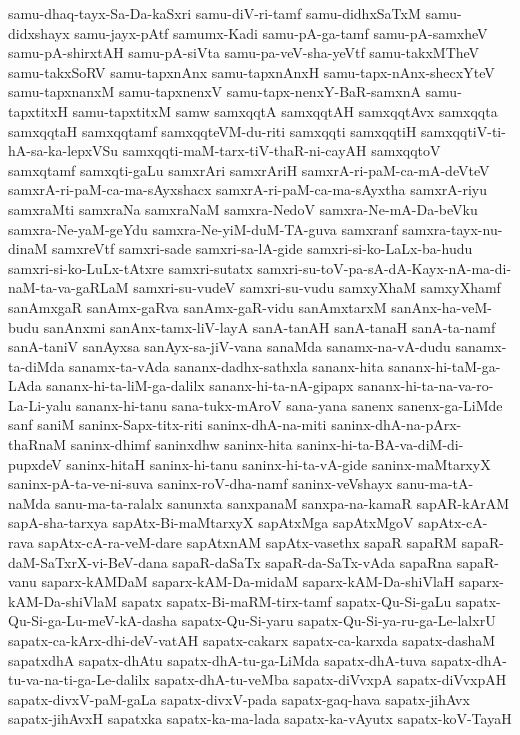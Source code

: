 {samu-dhaq-tayx-Sa-Da-kaSxri
samu-diV-ri-tamf
samu-didhxSaTxM
samu-didxshayx
samu-jayx-pAtf
samumx-Kadi
samu-pA-ga-tamf
samu-pA-samxheV
samu-pA-shirxtAH
samu-pA-siVta
samu-pa-veV-sha-yeVtf
samu-takxMTheV
samu-takxSoRV
samu-tapxnAnx
samu-tapxnAnxH
samu-tapx-nAnx-shecxYteV
samu-tapxnanxM
samu-tapxnenxV
samu-tapx-nenxY-BaR-samxnA
samu-tapxtitxH
samu-tapxtitxM
samw
samxqqtA
samxqqtAH
samxqqtAvx
samxqqta
samxqqtaH
samxqqtamf
samxqqteVM-du-riti
samxqqti
samxqqtiH
samxqqtiV-ti-hA-sa-ka-lepxVSu
samxqqti-maM-tarx-tiV-thaR-ni-cayAH
samxqqtoV
samxqtamf
samxqti-gaLu
samxrAri
samxrAriH
samxrA-ri-paM-ca-mA-deVteV
samxrA-ri-paM-ca-ma-sAyxshacx
samxrA-ri-paM-ca-ma-sAyxtha
samxrA-riyu
samxraMti
samxraNa
samxraNaM
samxra-NedoV
samxra-Ne-mA-Da-beVku
samxra-Ne-yaM-geYdu
samxra-Ne-yiM-duM-TA-guva
samxranf
samxra-tayx-nu-dinaM
samxreVtf
samxri-sade
samxri-sa-lA-gide
samxri-si-ko-LaLx-ba-hudu
samxri-si-ko-LuLx-tAtxre
samxri-sutatx
samxri-su-toV-pa-sA-dA-Kayx-nA-ma-di-naM-ta-va-gaRLaM
samxri-su-vudeV
samxri-su-vudu
samxyXhaM
samxyXhamf
sanAmxgaR
sanAmx-gaRva
sanAmx-gaR-vidu
sanAmxtarxM
sanAnx-ha-veM-budu
sanAnxmi
sanAnx-tamx-liV-layA
sanA-tanAH
sanA-tanaH
sanA-ta-namf
sanA-taniV
sanAyxsa
sanAyx-sa-jiV-vana
sanaMda
sanamx-na-vA-dudu
sanamx-ta-diMda
sanamx-ta-vAda
sananx-dadhx-sathxla
sananx-hita
sananx-hi-taM-ga-LAda
sananx-hi-ta-liM-ga-dalilx
sananx-hi-ta-nA-gipapx
sananx-hi-ta-na-va-ro-La-Li-yalu
sananx-hi-tanu
sana-tukx-mAroV
sana-yana
sanenx
sanenx-ga-LiMde
sanf
saniM
saninx-Sapx-titx-riti
saninx-dhA-na-miti
saninx-dhA-na-pArx-thaRnaM
saninx-dhimf
saninxdhw
saninx-hita
saninx-hi-ta-BA-va-diM-di-pupxdeV
saninx-hitaH
saninx-hi-tanu
saninx-hi-ta-vA-gide
saninx-maMtarxyX
saninx-pA-ta-ve-ni-suva
saninx-roV-dha-namf
saninx-veVshayx
sanu-ma-tA-naMda
sanu-ma-ta-ralalx
sanunxta
sanxpanaM
sanxpa-na-kamaR
sapAR-kArAM
sapA-sha-tarxya
sapAtx-Bi-maMtarxyX
sapAtxMga
sapAtxMgoV
sapAtx-cA-rava
sapAtx-cA-ra-veM-dare
sapAtxnAM
sapAtx-vasethx
sapaR
sapaRM
sapaR-daM-SaTxrX-vi-BeV-dana
sapaR-daSaTx
sapaR-da-SaTx-vAda
sapaRna
sapaR-vanu
saparx-kAMDaM
saparx-kAM-Da-midaM
saparx-kAM-Da-shiVlaH
saparx-kAM-Da-shiVlaM
sapatx
sapatx-Bi-maRM-tirx-tamf
sapatx-Qu-Si-gaLu
sapatx-Qu-Si-ga-Lu-meV-kA-dasha
sapatx-Qu-Si-yaru
sapatx-Qu-Si-ya-ru-ga-Le-lalxrU
sapatx-ca-kArx-dhi-deV-vatAH
sapatx-cakarx
sapatx-ca-karxda
sapatx-dashaM
sapatxdhA
sapatx-dhAtu
sapatx-dhA-tu-ga-LiMda
sapatx-dhA-tuva
sapatx-dhA-tu-va-na-ti-ga-Le-dalilx
sapatx-dhA-tu-veMba
sapatx-diVvxpA
sapatx-diVvxpAH
sapatx-divxV-paM-gaLa
sapatx-divxV-pada
sapatx-gaq-hava
sapatx-jihAvx
sapatx-jihAvxH
sapatxka
sapatx-ka-ma-lada
sapatx-ka-vAyutx
sapatx-koV-TayaH
}
